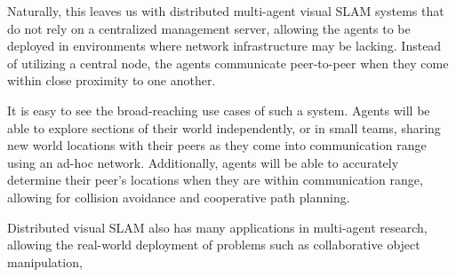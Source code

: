 Naturally, this leaves us with distributed multi-agent visual SLAM systems that do not rely on a centralized management server, allowing the agents to be deployed in environments where network infrastructure may be lacking. Instead of utilizing a central node, the agents communicate peer-to-peer when they come within close proximity to one another.

It is easy to see the broad-reaching use cases of such a system. Agents will be able to explore sections of their world independently, or in small teams, sharing new world locations with their peers as they come into communication range using an ad-hoc network. Additionally, agents will be able to accurately determine their peer's locations when they are within communication range, allowing for collision avoidance and cooperative path planning.

Distributed visual SLAM also has many applications in multi-agent research, allowing the real-world deployment of problems such as collaborative object manipulation,

